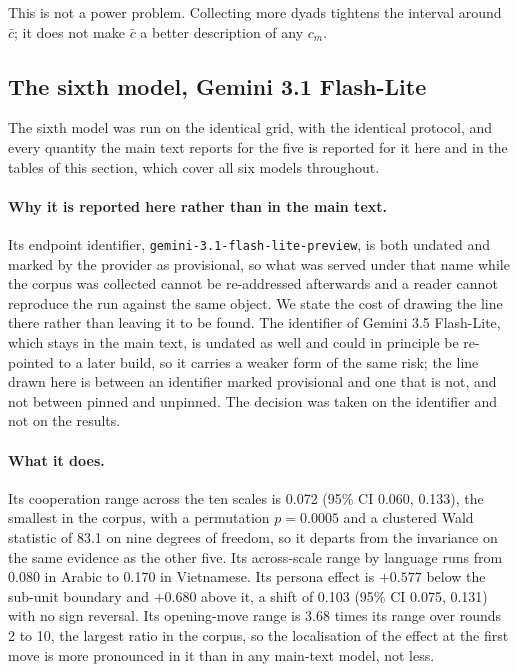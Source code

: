 \documentclass[openacc]{rsproca_new}
\newcommand{\ci}[2]{(95\% CI #1, #2)}
\begin{document}
This is not a power problem. Collecting more dyads tightens the interval around
$\bar{c}$; it does not make $\bar{c}$ a better description of any $c_m$.

\subsection{The sixth model, Gemini 3.1 Flash-Lite}\label{appendix:sixth_model}

The sixth model was run on the identical grid, with the identical protocol, and
every quantity the main text reports for the five is reported for it here and
in the tables of this section, which cover all six models throughout.

\paragraph{Why it is reported here rather than in the main text.} Its endpoint
identifier, \texttt{gemini-3.1-flash-lite-preview}, is both undated and marked
by the provider as provisional, so what was served under that name while the
corpus was collected cannot be re-addressed afterwards and a reader cannot
reproduce the run against the same object. We state the cost of drawing the
line there rather than leaving it to be found. The identifier of Gemini 3.5
Flash-Lite, which stays in the main text, is undated as well and could in
principle be re-pointed to a later build, so it carries a weaker form of the
same risk; the line drawn here is between an identifier marked provisional and
one that is not, and not between pinned and unpinned. The decision was taken on
the identifier and not on the results.

\paragraph{What it does.} Its cooperation range across the ten scales is 0.072
\ci{0.060}{0.133}, the smallest in the corpus, with a permutation $p = 0.0005$
and a clustered Wald statistic of 83.1 on nine degrees of freedom, so it
departs from the invariance on the same evidence as the other five. Its
across-scale range by language runs from 0.080 in Arabic to 0.170 in
Vietnamese. Its persona effect is $+0.577$ below the sub-unit boundary and
$+0.680$ above it, a shift of 0.103 \ci{0.075}{0.131} with no sign reversal.
Its opening-move range is 3.68 times its range over rounds 2 to 10, the largest
ratio in the corpus, so the localisation of the effect at the first move is
more pronounced in it than in any main-text model, not less.
\end{document}
